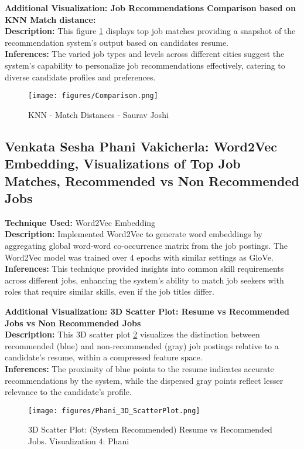 \documentclass[a4paper,10pt]{article}
\begin{document}
\textbf{Additional Visualization: Job Recommendations Comparison based on KNN Match distance: }\\
\textbf{Description:} This figure \ref{fig_comparison} displays top job matches providing a snapshot of the recommendation system’s output based on candidates resume.\\
\textbf{Inferences:} The varied job types and levels across different cities suggest the system's capability to personalize job recommendations effectively, catering to diverse candidate profiles and preferences.

 \begin{figure}[ht]
    \centering
    \texttt{[image: figures/Comparison.png]}
    \caption{KNN - Match Distances - Saurav Joshi}
    \label{fig_comparison}
    \end{figure}
\subsection{Venkata Sesha Phani Vakicherla: Word2Vec Embedding, Visualizations of Top Job Matches, Recommended vs Non Recommended Jobs}
\textbf{Technique Used:} Word2Vec Embedding\\
\textbf{Description:} Implemented Word2Vec to generate word embeddings by aggregating global word-word co-occurrence matrix from the job postings. The Word2Vec model was trained over 4 epochs with similar settings as GloVe.\\
\textbf{Inferences:} This technique provided insights into common skill requirements across different jobs, enhancing the system's ability to match job seekers with roles that require similar skills, even if the job titles differ.

\textbf{Additional Visualization: 3D Scatter Plot: Resume vs Recommended Jobs vs Non Recommended Jobs}\\
\textbf{Description:} This 3D scatter plot \ref{fig_scat_plot} visualizes the distinction between recommended (blue) and non-recommended (gray) job postings relative to a candidate’s resume, within a compressed feature space. \\
\textbf{Inferences:} The proximity of blue points to the resume indicates accurate recommendations by the system, while the dispersed gray points reflect lesser relevance to the candidate's profile.

    \begin{figure}[ht]
    \centering
    \texttt{[image: figures/Phani\_3D\_ScatterPlot.png]}
    \caption{3D Scatter Plot: (System Recommended) Resume vs Recommended Jobs. Visualization 4: Phani}
    \label{fig_scat_plot}
    \end{figure}
\end{document}
